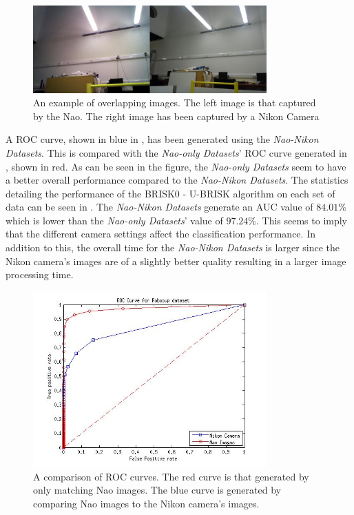 \begin{figure}[h!] 
  \centering
    \includegraphics[width=0.8\textwidth]{../Drawings/camera/compareRobocup.jpg}
    \caption{An example of overlapping images. The left image is that captured by the Nao. The right image has been captured by a Nikon Camera}
    \label{fig:cameraOverlapRobocup}
\end{figure}

A ROC curve, shown in blue in , has been generated using the \textit{Nao-Nikon Datasets}.  This is compared with the \textit{Nao-only Datasets}' ROC curve generated in , shown in red. As can be seen in the figure, the \textit{Nao-only Datasets} seem to have a better overall performance compared to the \textit{Nao-Nikon Datasets}. The statistics detailing the performance of the BRISK0 - U-BRISK algorithm on each set of data can be seen in . The \textit{Nao-Nikon Datasets} generate an AUC value of $84.01\%$ which is lower than the \textit{Nao-only Datasets}' value of $97.24\%$. This seems to imply that the different camera settings affect the classification performance. In addition to this, the overall time for the \textit{Nao-Nikon Datasets} is larger since the Nikon camera's images are of a slightly better quality resulting in a larger image processing time. \\

\begin{figure}[h!] 
  \centering
    \includegraphics[width=0.8\textwidth]{../Drawings/camera/ROC_Robocup.jpg}
    \caption{A comparison of ROC curves. The red curve is that generated by only matching Nao images. The blue curve is generated by comparing Nao images to the Nikon camera's images. }
    \label{fig:rocRobocupNikon}
\end{figure}

